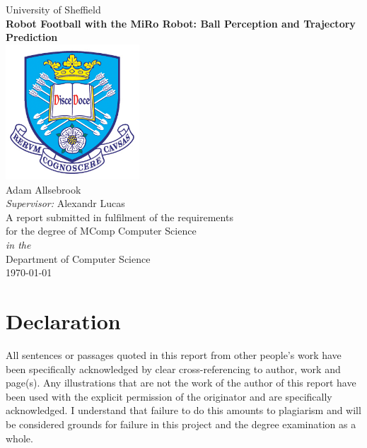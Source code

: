 \documentclass[11pt,oneside]{book}
\begin{document}
\frontmatter

\begin{titlepage}


\begin{center}
{\LARGE University of Sheffield}\\[1.5cm]
\linespread{1.2}\huge {\bfseries Robot Football with the MiRo Robot: Ball Perception and Trajectory Prediction}\\[1.5cm]
\linespread{1}
\includegraphics[width=5cm]{images/tuoslogo.png}\\[1cm]
{\Large Adam Allsebrook}\\[1cm]
{\large \emph{Supervisor:} Alexandr Lucas}\\[1cm]
\large A report submitted in fulfilment of the requirements\\ for the degree of MComp Computer Science\\[0.3cm] 
\textit{in the}\\[0.3cm]
Department of Computer Science\\[2cm]
\today
\end{center}

\end{titlepage}


\newpage
\chapter*{\Large Declaration}


All sentences or passages quoted in this report from other people's work have been specifically acknowledged by clear cross-referencing to author, work and page(s). Any illustrations that are not the work of the author of this report have been used with the explicit permission of the originator and are specifically acknowledged. I understand that failure to do this amounts to plagiarism and will be considered grounds for failure in this project and the degree examination as a whole.\\[1cm]
\end{document}
